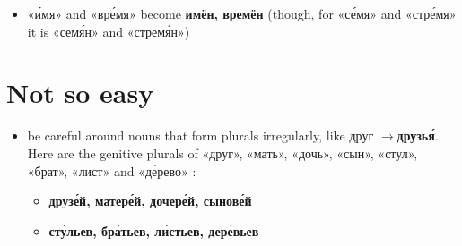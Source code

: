 \begin{itemize}
  \begin{itemize}
  \tightlist
  \item
    ночь, кров\'{а}ть $ \rightarrow$ \textbf{ноч\'{е}й}, кров\'{а}тей
  \item
    уч\'{и}тель, муж $ \rightarrow$ учител\'{е}й, муж\'{е}й
  \item
    м\'{о}ре $ \rightarrow$ \textbf{мор\'{е}й}
  \end{itemize}
\item
  «\'{и}мя» and «вр\'{е}мя» become \textbf{имён, времён} (though, for «с\'{е}мя» and
  «стр\'{е}мя» it is «сем\'{я}н» and «стрем\'{я}н»)
\end{itemize}

\section{Not so easy}\label{not-so-easy}

\begin{itemize}
\item
  be careful around nouns that form plurals irregularly, like друг
  $ \rightarrow$\textbf{друзь\'{я}}. Here are the genitive plurals of «друг», «мать»,
  «дочь», «сын», «стул», «брат», «лист» and «д\'{е}рево» :

  \begin{itemize}
  \tightlist
  \item
    \textbf{друз\'{е}й, матер\'{е}й, дочер\'{е}й, сынов\'{е}й}
  \item
    \textbf{ст\'{у}льев, бр\'{а}тьев, л\'{и}стьев, дер\'{е}вьев}
  \end{itemize}
\end{itemize}
